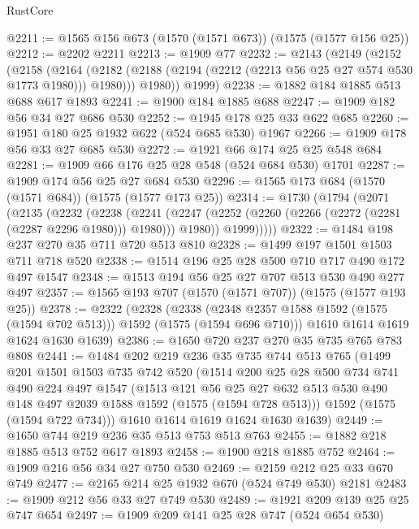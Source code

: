 \begin{lexlean}{RustCore}
\begin{coremodule}
@2211 := @1565 @156 @673 (@1570 (@1571 @673)) (@1575 (@1577 @156 @25))
@2212 := @2202 @2211
@2213 := @1909 @77
@2232 := @2143
    (@2149
      (@2152
        (@2158
          (@2164 (@2182 (@2188 (@2194 (@2212 (@2213 @56 @25 @27 @574 @530 @1773 @1980))) @1980)))
          @1980))
      @1999)
@2238 := @1882 @184 @1885 @513 @688 @617 @1893
@2241 := @1900 @184 @1885 @688
@2247 := @1909 @182 @56 @34 @27 @686 @530
@2252 := @1945 @178 @25 @33 @622 @685
@2260 := @1951 @180 @25 @1932 @622 (@524 @685 @530) @1967
@2266 := @1909 @178 @56 @33 @27 @685 @530
@2272 := @1921 @66 @174 @25 @25 @548 @684
@2281 := @1909 @66 @176 @25 @28 @548 (@524 @684 @530) @1701
@2287 := @1909 @174 @56 @25 @27 @684 @530
@2296 := @1565 @173 @684 (@1570 (@1571 @684)) (@1575 (@1577 @173 @25))
@2314 := @1730
    (@1794
      (@2071
        (@2135
          (@2232
            (@2238
              (@2241
                (@2247 (@2252 (@2260 (@2266 (@2272 (@2281 (@2287 @2296 @1980))) @1980))) @1980))
              @1999)))))
@2322 := @1484 @198 @237 @270 @35 @711 @720 @513 @810
@2328 := @1499 @197 @1501 @1503 @711 @718 @520
@2338 := @1514 @196 @25 @28 @500 @710 @717 @490 @172 @497 @1547
@2348 := @1513 @194 @56 @25 @27 @707 @513 @530 @490 @277 @497
@2357 := @1565 @193 @707 (@1570 (@1571 @707)) (@1575 (@1577 @193 @25))
@2378 := @2322
    (@2328
      (@2338 (@2348 @2357 @1588 @1592 (@1575 (@1594 @702 @513))) @1592 (@1575 (@1594 @696 @710)))
      @1610
      @1614
      @1619
      @1624
      @1630
      @1639)
@2386 := @1650 @720 @237 @270 @35 @735 @765 @783 @808
@2441 := @1484
    @202
    @219
    @236
    @35
    @735
    @744
    @513
    @765
    (@1499
      @201
      @1501
      @1503
      @735
      @742
      @520
      (@1514
        @200
        @25
        @28
        @500
        @734
        @741
        @490
        @224
        @497
        @1547
        (@1513
          @121
          @56
          @25
          @27
          @632
          @513
          @530
          @490
          @148
          @497
          @2039
          @1588
          @1592
          (@1575 (@1594 @728 @513)))
        @1592
        (@1575 (@1594 @722 @734)))
      @1610
      @1614
      @1619
      @1624
      @1630
      @1639)
@2449 := @1650 @744 @219 @236 @35 @513 @753 @513 @763
@2455 := @1882 @218 @1885 @513 @752 @617 @1893
@2458 := @1900 @218 @1885 @752
@2464 := @1909 @216 @56 @34 @27 @750 @530
@2469 := @2159 @212 @25 @33 @670 @749
@2477 := @2165 @214 @25 @1932 @670 (@524 @749 @530) @2181
@2483 := @1909 @212 @56 @33 @27 @749 @530
@2489 := @1921 @209 @139 @25 @25 @747 @654
@2497 := @1909 @209 @141 @25 @28 @747 (@524 @654 @530)

\end{coremodule}
\end{lexlean}
